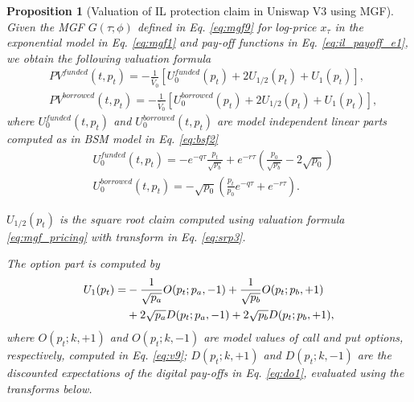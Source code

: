 \documentclass[pdftex,11pt,a4paper] {article}
\newtheorem{proposition}{Proposition}[section]
\begin{document}
\begin{proposition}[Valuation of IL protection claim in Uniswap V3 using MGF]
Given the MGF $G(\tau; \phi)$ defined in Eq. \eqref{eq:mgf9} for log-price $%
x_{\tau}$ in the exponential model in Eq. \eqref{eq:mgf1} and pay-off
functions in Eq. \eqref{eq:il_payoff_e1}, we obtain the following valuation
formula
\begin{equation}  \label{eq:mgfp1}
\begin{split}
& PV^{funded}(t, p_{t}) = - \frac{1}{\bar{V}_{0}}\left[U^{funded}_{0}(p_{t}) + 2U_{1/2}(p_{t}) +
U_{1}(p_{t})\right], \\
& PV^{borrowed}(t, p_{t}) = - \frac{1}{\bar{V}_{0}}\left[U^{borrowed}_{0}(p_{t}) + 2U_{1/2}(p_{t})
+ U_{1}(p_{t})\right],
\end{split}%
\end{equation}
where $U^{funded}_{0}(t, p_{t})$ and $U^{borrowed}_{0}(t, p_{t}) $ are model
independent linear parts computed as in BSM model in Eq. \eqref{eq:bsf2}
\begin{equation}  \label{eq:mgfp2}
\begin{split}
& U^{funded}_{0}(t, p_{t}) = -e^{-q\tau}\frac{p_{t}}{\sqrt{p_{b}}} +
e^{-r\tau}\left(\frac{p_{0}}{\sqrt{p_{b}}}-2\sqrt{p_{0}}\right) \\
& U^{borrowed}_{0}(t, p_{t}) = -\sqrt{p_{0}}\left(\frac{p_{t}}{p_{0}}%
e^{-q\tau} + e^{-r\tau}\right).
\end{split}%
\end{equation}

$U_{1/2}(p_{t})$ is the square root claim computed using valuation formula %
\eqref{eq:mgf_pricing} with transform in Eq. \eqref{eq:srp3}.

The option part is computed by
\begin{equation}  \label{eq:mgfp3}
\begin{split}
U_{1}(p_{t}) = & -\frac{1}{\sqrt{p_{a}}} O(p_{t}; p_{a}, -1) +\frac{1}{\sqrt{%
p_{b}}} O(p_{t}; p_{b}, +1) \\
& +2\sqrt{p_{a}} D(p_{t}; p_{a}, -1) +2\sqrt{p_{b}}D(p_{t}; p_{b}, +1),
\end{split}%
\end{equation}
where $O(p_{t}; k, +1)$ and $O(p_{t}; k, -1)$ are model values of call and
put options, respectively, computed in Eq. \eqref{eq:v9}; $D(p_{t};k,+1)$
and $D(p_{t};k,-1)$ are the discounted expectations of the digital pay-offs in Eq. \eqref{eq:do1}, evaluated using the transforms below.
\end{proposition}
\end{document}
